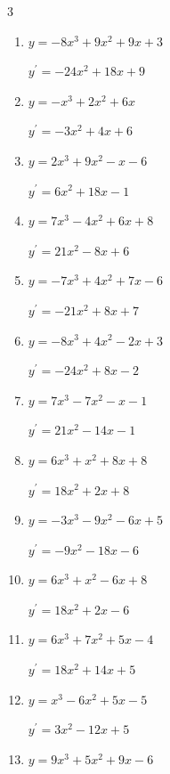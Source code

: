 \begin{multicols}{3}
\begin{enumerate}
        $\displaystyle y^{\prime}=-15x^{2}-12x+2$

  \item $y=-8x^{3}+9x^{2}+9x+3$

        $\displaystyle y^{\prime}=-24x^{2}+18x+9$

\columnbreak %

  \item $y=-x^{3}+2x^{2}+6x$

        $\displaystyle y^{\prime}=-3x^{2}+4x+6$

  \item $y=2x^{3}+9x^{2}-x-6$

        $\displaystyle y^{\prime}=6x^{2}+18x-1$

  \item $y=7x^{3}-4x^{2}+6x+8$

        $\displaystyle y^{\prime}=21x^{2}-8x+6$

  \item $y=-7x^{3}+4x^{2}+7x-6$

        $\displaystyle y^{\prime}=-21x^{2}+8x+7$

  \item $y=-8x^{3}+4x^{2}-2x+3$

        $\displaystyle y^{\prime}=-24x^{2}+8x-2$

  \item $y=7x^{3}-7x^{2}-x-1$

        $\displaystyle y^{\prime}=21x^{2}-14x-1$

  \item $y=6x^{3}+x^{2}+8x+8$

        $\displaystyle y^{\prime}=18x^{2}+2x+8$

  \item $y=-3x^{3}-9x^{2}-6x+5$

        $\displaystyle y^{\prime}=-9x^{2}-18x-6$

  \item $y=6x^{3}+x^{2}-6x+8$

        $\displaystyle y^{\prime}=18x^{2}+2x-6$

  \item $y=6x^{3}+7x^{2}+5x-4$

        $\displaystyle y^{\prime}=18x^{2}+14x+5$

  \item $y=x^{3}-6x^{2}+5x-5$

        $\displaystyle y^{\prime}=3x^{2}-12x+5$

  \item $y=9x^{3}+5x^{2}+9x-6$


\end{enumerate}
\end{multicols}
